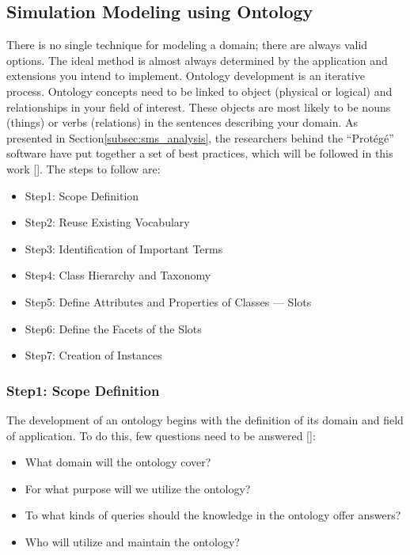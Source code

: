 \subsection{Simulation Modeling using Ontology}
There is no single technique for modeling a domain; there are always valid options. The ideal method is almost always determined by the application and extensions you intend to implement. Ontology development is an iterative process. Ontology concepts need to be linked to object (physical or logical) and relationships in your field of interest. These objects are most likely to be nouns (things) or verbs (relations) in the sentences describing your domain. As presented in Section\ref{subsec:sms_analysis}, the researchers behind the “Protégé” software have put together a set of best practices, which will be followed in this work []. The steps to follow are:

\begin{itemize}
    \item Step1: Scope Definition
    \item Step2: Reuse Existing Vocabulary
    \item Step3: Identification of Important Terms
    \item Step4: Class Hierarchy and Taxonomy
    \item Step5: Define Attributes and Properties of Classes — Slots
    \item Step6: Define the Facets of the Slots
    \item Step7: Creation of Instances
\end{itemize}

    \subsubsection{Step1: Scope Definition}
    The development of an ontology begins with the definition of its domain and field of application. To do this, few questions need to be answered []:
    
    \begin{itemize}
        \item What domain will the ontology cover? 
        \item For what purpose will we utilize the ontology? 
        \item To what kinds of queries should the knowledge in the ontology offer answers? 
        \item Who will utilize and maintain the ontology?
    \end{itemize}
    
